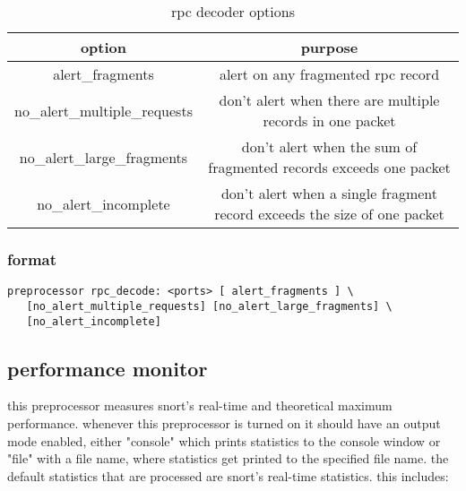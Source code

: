\documentclass[english]{report}
\begin{document}
\begin{table}[!hbpt]

\caption{rpc decoder options\label{rpc options}}

\begin{center}\begin{tabular}{|c|c|}
\hline 
option&
purpose\\
\hline
\hline 
alert\_fragments&
alert on any fragmented rpc record\\
\hline 
no\_alert\_multiple\_requests&
don't alert when there are multiple records in one packet\\
\hline 
no\_alert\_large\_fragments&
don't alert when the sum of fragmented records exceeds one packet\\
\hline 
no\_alert\_incomplete&
don't alert when a single fragment record exceeds the size of one
packet\\
\hline
\end{tabular}\end{center}
\end{table}

\subsubsection{format}

\begin{verbatim}
preprocessor rpc_decode: <ports> [ alert_fragments ] \
   [no_alert_multiple_requests] [no_alert_large_fragments] \
   [no_alert_incomplete]
\end{verbatim}

\subsection{performance monitor\label{sub:perfmonitor}}

this preprocessor measures snort's real-time and theoretical maximum
performance.  whenever this preprocessor is turned on it should have an output
mode enabled, either "console" which prints statistics to the console window or
"file" with a file name, where statistics get printed to the specified file
name.   the default statistics that are processed are snort's real-time
statistics.  this includes:
\end{document}

